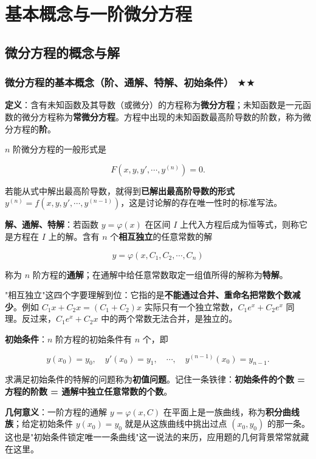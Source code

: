 \documentclass[11pt,openany,UTF8]{ctexbook}
\begin{document}
\section{基本概念与一阶微分方程}

\subsection{微分方程的概念与解}

\subsubsection{微分方程的基本概念（阶、通解、特解、初始条件） $\bigstar$$\bigstar$}

\textbf{定义}：含有未知函数及其导数（或微分）的方程称为\textbf{微分方程}；未知函数是一元函数的微分方程称为\textbf{常微分方程}。方程中出现的未知函数最高阶导数的阶数，称为微分方程的\textbf{阶}。

$n$ 阶微分方程的一般形式是

\[F\left(x,y,y',\cdots,y^{(n)}\right)=0 .\]

若能从式中解出最高阶导数，就得到\textbf{已解出最高阶导数的形式} $y^{(n)}=f\left(x,y,y',\cdots,y^{(n-1)}\right)$，这是讨论解的存在唯一性时的标准写法。

\textbf{解、通解、特解}：若函数 $y=\varphi(x)$ 在区间 $I$ 上代入方程后成为恒等式，则称它是方程在 $I$ 上的解。含有 $n$ 个\textbf{相互独立}的任意常数的解

\[y=\varphi(x,C_1,C_2,\cdots,C_n)\]

称为 $n$ 阶方程的\textbf{通解}；在通解中给任意常数取定一组值所得的解称为\textbf{特解}。

"相互独立"这四个字要理解到位：它指的是\textbf{不能通过合并、重命名把常数个数减少}。例如 $C_1x+C_2x=(C_1+C_2)x$ 实际只有一个独立常数，$C_1e^{x}+C_2e^{x}$ 同理。反过来，$C_1e^{x}+C_2x$ 中的两个常数无法合并，是独立的。

\textbf{初始条件}：$n$ 阶方程的初始条件有 $n$ 个，即

\[y(x_0)=y_0,\quad y'(x_0)=y_1,\quad \cdots,\quad y^{(n-1)}(x_0)=y_{n-1}.\]

求满足初始条件的特解的问题称为\textbf{初值问题}。记住一条铁律：\textbf{初始条件的个数 = 方程的阶数 = 通解中独立任意常数的个数}。

\textbf{几何意义}：一阶方程的通解 $y=\varphi(x,C)$ 在平面上是一族曲线，称为\textbf{积分曲线族}；给定初始条件 $y(x_0)=y_0$ 就是从这族曲线中挑出过点 $(x_0,y_0)$ 的那一条。这也是"初始条件锁定唯一一条曲线"这一说法的来历，应用题的几何背景常常就藏在这里。
\end{document}
